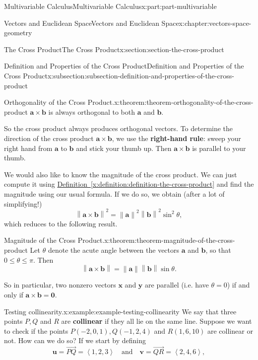 \documentclass[twoside,10pt,]{tufte-book}
\newcommand{\xreffont}{\relax}
\newcommand{\terminology}[1]{\textbf{#1}}
\numberwithin{equation}{part}
\newcommand{\norm}[1]{\left\| #1 \right\|}
\newcommand{\dotprod}[1]{\left\langle #1 \right\rangle}
\begin{document}
\begin{partptx}{Multivariable Calculus}{}{Multivariable Calculus}{}{}{x:part:part-multivariable}
\begin{chapterptx}{Vectors and Euclidean Space}{}{Vectors and Euclidean Space}{}{}{x:chapter:vectors-space-geometry}
\begin{sectionptx}{The Cross Product}{}{The Cross Product}{}{}{x:section:section-the-cross-product}
\begin{subsectionptx}{Definition and Properties of the Cross Product}{}{Definition and Properties of the Cross Product}{}{}{x:subsection:subsection-definition-and-properties-of-the-cross-product}
\begin{theorem}{Orthogonality of the Cross Product.}{}{x:theorem:theorem-orthogonality-of-the-cross-product}
%
\(\mathbf{a}\times\mathbf{b}\) is always orthogonal to both \(\mathbf{a}\) and \(\mathbf{b}\).%
\end{theorem}
So the cross product always produces orthogonal vectors. To determine the direction of the cross product \(\mathbf{a}\times\mathbf{b}\), we use the \terminology{right-hand rule}: sweep your right hand from \(\mathbf{a}\) to \(\mathbf{b}\) and stick your thumb up. Then \(\mathbf{a}\times\mathbf{b}\) is parallel to your thumb.%
\par
We would also like to know the magnitude of the cross product. We can just compute it using \hyperref[x:definition:definition-the-cross-product]{Definition~{\xreffont\ref{x:definition:definition-the-cross-product}}} and find the magnitude using our usual formula. If we do so, we obtain (after a lot of simplifying!)%
%
\begin{equation*}
\norm{\mathbf{a}\times\mathbf{b}}^{2} = \norm{\mathbf{a}}^{2}\norm{\mathbf{b}}^{2}\sin^{2}\theta,
\end{equation*}
which reduces to the following result.%
\begin{theorem}{Magnitude of the Cross Product.}{}{x:theorem:theorem-magnitude-of-the-cross-product}%
%
Let \(\theta\) denote the acute angle between the vectors \(\mathbf{a}\) and \(\mathbf{b}\), so that \(0\leq\theta\leq\pi\). Then%
%
\begin{equation*}
\norm{\mathbf{a}\times\mathbf{b}} = \norm{\mathbf{a}}\norm{\mathbf{b}}\sin\theta.
\end{equation*}
\end{theorem}
So in particular, two nonzero vectors \(\mathbf{x}\) and \(\mathbf{y}\) are parallel (i.e. have \(\theta=0\)) if and only if \(\mathbf{a}\times\mathbf{b} = \mathbf{0}\).%
\begin{example}{Testing collinearity.}{x:example:example-testing-collinearity}%
We say that three points \(P,Q\) and \(R\) are \terminology{collinear} if they all lie on the same line. Suppose we want to check if the points \(P(-2,0,1), Q(-1,2,4)\) and \(R(1,6,10)\) are collinear or not. How can we do so? If we start by defining%
%
\begin{equation*}
\mathbf{u} = \vec{PQ} = \dotprod{1,2,3}\quad\text{and}\quad \mathbf{v} = \vec{QR} = \dotprod{2,4,6},
\end{equation*}

\end{example}
\end{subsectionptx}
\end{sectionptx}
\end{chapterptx}
\end{partptx}
\end{document}
